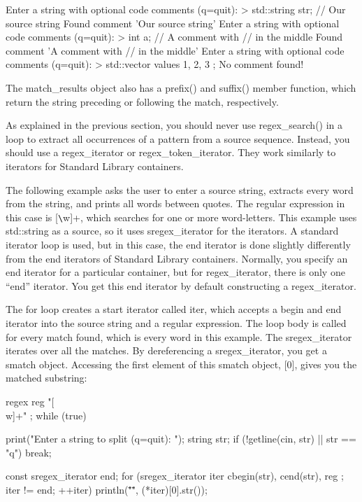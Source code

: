 \begin{shell}
Enter a string with optional code comments (q=quit):
> std::string str; // Our source string
  Found comment 'Our source string'
Enter a string with optional code comments (q=quit):
> int a; // A comment with // in the middle
  Found comment 'A comment with // in the middle'
Enter a string with optional code comments (q=quit):
> std::vector values { 1, 2, 3 };
  No comment found!
\end{shell}

The match\_results object also has a prefix() and suffix() member function, which return the string preceding or following the match, respectively.


As explained in the previous section, you should never use regex\_search() in a loop to extract all occurrences of a pattern from a source sequence. Instead, you should use a regex\_iterator or regex\_token\_iterator. They work similarly to iterators for Standard Library containers.


The following example asks the user to enter a source string, extracts every word from the string, and prints all words between quotes. The regular expression in this case is [\verb|\|w]+, which searches for one or more word-letters. This example uses std::string as a source, so it uses sregex\_iterator for the iterators. A standard iterator loop is used, but in this case, the end iterator is done slightly differently from the end iterators of Standard Library containers. Normally, you specify an end iterator for a particular container, but for regex\_iterator, there is only one “end” iterator. You get this end iterator by default constructing a regex\_iterator.

The for loop creates a start iterator called iter, which accepts a begin and end iterator into the source string and a regular expression. The loop body is called for every match found, which is every word in this example. The sregex\_iterator iterates over all the matches. By dereferencing a sregex\_iterator, you get a smatch object. Accessing the first element of this smatch object, [0], gives you the matched substring:

\begin{cpp}
regex reg { "[\\w]+" };
while (true) {
    print("Enter a string to split (q=quit): ");
    string str;
    if (!getline(cin, str) || str == "q") { break; }

    const sregex_iterator end;
    for (sregex_iterator iter { cbegin(str), cend(str), reg };
    iter != end; ++iter) {
        println("\"{}\"", (*iter)[0].str());
    }
}
\end{cpp}

